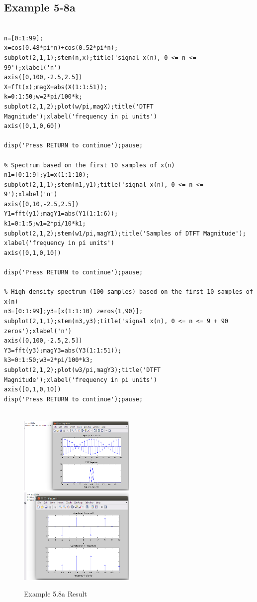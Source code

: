 \documentclass[11pt
  , a4paper
  , article
  , oneside
]{memoir}
\begin{document}
\subsection{Example 5-8a}
\begin{lstlisting}[style=termstyle]
% Example 5-8a

n=[0:1:99];
x=cos(0.48*pi*n)+cos(0.52*pi*n);
subplot(2,1,1);stem(n,x);title('signal x(n), 0 <= n <= 99');xlabel('n')
axis([0,100,-2.5,2.5])
X=fft(x);magX=abs(X(1:1:51));
k=0:1:50;w=2*pi/100*k;
subplot(2,1,2);plot(w/pi,magX);title('DTFT Magnitude');xlabel('frequency in pi units')
axis([0,1,0,60])

disp('Press RETURN to continue');pause;

% Spectrum based on the first 10 samples of x(n)
n1=[0:1:9];y1=x(1:1:10);
subplot(2,1,1);stem(n1,y1);title('signal x(n), 0 <= n <= 9');xlabel('n')
axis([0,10,-2.5,2.5])
Y1=fft(y1);magY1=abs(Y1(1:1:6));
k1=0:1:5;w1=2*pi/10*k1;
subplot(2,1,2);stem(w1/pi,magY1);title('Samples of DTFT Magnitude');
xlabel('frequency in pi units')
axis([0,1,0,10])

disp('Press RETURN to continue');pause;

% High density spectrum (100 samples) based on the first 10 samples of x(n)
n3=[0:1:99];y3=[x(1:1:10) zeros(1,90)];
subplot(2,1,1);stem(n3,y3);title('signal x(n), 0 <= n <= 9 + 90 zeros');xlabel('n')
axis([0,100,-2.5,2.5])
Y3=fft(y3);magY3=abs(Y3(1:1:51));
k3=0:1:50;w3=2*pi/100*k3;
subplot(2,1,2);plot(w3/pi,magY3);title('DTFT Magnitude');xlabel('frequency in pi units')
axis([0,1,0,10])
disp('Press RETURN to continue');pause;


\end{lstlisting}

\begin{figure}[h!]
	\centering
	\includegraphics[width=0.5\textwidth,height=0.4\textwidth]{./images/ex508a.png}
	\includegraphics[width=0.5\textwidth,height=0.4\textwidth]{./images/ex508b.png}
	\caption{Example 5.8a Result}
	\label{fig:Example 5.8a Result}
\end{figure}
\end{document}
